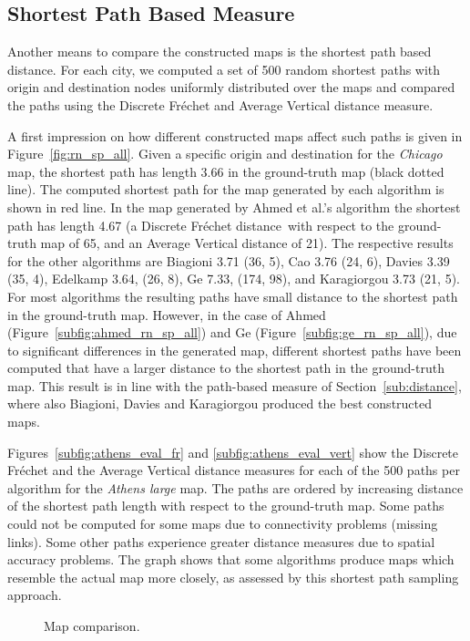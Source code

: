 \documentclass[natbib]{svjour3}                    \smartqed  \usepackage[table]{xcolor}
\newcommand{\Frd}{Fr\'echet distance}
\begin{document}
\subsection{Shortest Path Based Measure}

Another means to compare the constructed maps is the shortest path based distance. For each city, we computed a set of 500 random shortest paths with origin and destination nodes uniformly distributed over the maps and compared the paths using the Discrete Fréchet and Average Vertical distance measure.

A first impression on how different constructed maps affect such paths is given in Figure~\ref{fig:rn_sp_all}. Given 
 a specific  origin and destination for the \emph{Chicago} map, the shortest path has length 3.66 in the ground-truth map (black dotted line). 
The computed shortest path for the map generated by each algorithm is shown in red line. In the map generated by Ahmed et al.'s algorithm the shortest path has length 4.67 (a Discrete \Frd\ with respect to the ground-truth map of 65, and an Average Vertical distance of 21). 
The respective results for the other algorithms are Biagioni 3.71 (36, 5), Cao 3.76 (24, 6), Davies 3.39 (35, 4), Edelkamp 3.64, (26, 8), Ge 7.33, (174, 98), and Karagiorgou 3.73 (21, 5).
For most algorithms the resulting paths have small distance to the shortest path in the ground-truth map. However, in the case of Ahmed (Figure~\ref{subfig:ahmed_rn_sp_all}) and Ge (Figure~\ref{subfig:ge_rn_sp_all}), due to significant differences in the generated map, different shortest paths have been computed that have a larger distance to the shortest path in the ground-truth map. This result is in line with the path-based measure of Section~\ref{sub:distance}, where also Biagioni, Davies and Karagiorgou produced the best constructed maps.
 
Figures~\ref{subfig:athens_eval_fr} and \ref{subfig:athens_eval_vert} show the Discrete Fréchet and the Average Vertical distance measures for each of the 500 paths per algorithm for the \emph{Athens large} map. The paths are ordered by increasing distance of the shortest path length with respect to the ground-truth map. Some paths could not be computed for some maps due to connectivity problems (missing links). Some other paths experience greater distance measures due to spatial accuracy problems. The graph shows that some algorithms produce maps which resemble the actual map more closely, as assessed by this shortest path sampling approach.
 

\begin{figure}[htbp]
 \begin{center}
\hspace{0.05cm}	 
 \end{center}
\caption{Map comparison.}
\end{figure}
\end{document}
